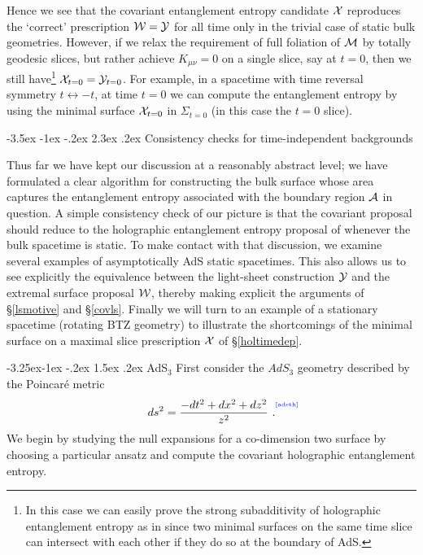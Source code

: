 \documentclass[12pt]{article}
\makeatletter
\renewcommand\section{\@startsection {section}{1}{\z@}%
                                   {-3.5ex \@plus -1ex \@minus -.2ex}%
                                   {2.3ex \@plus.2ex}%
                                   {\normalfont\large\bfseries}}
\renewcommand\subsection{\@startsection{subsection}{2}{\z@}%
                                     {-3.25ex\@plus -1ex \@minus -.2ex}%
                                     {1.5ex \@plus .2ex}%
                                     {\normalfont\bfseries}}
\newcommand{\be}{\begin{equation}}
\newcommand{\ee}{\end{equation}}
\def\sec#1{\S \;\ref{#1}}
\def\CA{{\cal A}}
\def\CW{{\cal W}}
\def\CX{{\cal X}}
\def\CY{{\cal Y}}
\def\f#1#2{{\frac{#1}{#2}}}
\def\f#1#2{{\frac{#1}{#2}}}
\def\Label#1{\label{#1}%
{ \color{blue}{\smash{\hbox to0pt{\raise2ex\hbox{\tiny[#1]}\hss}}}}}
\def\bulk{{\cal M}}
\def\Gms{\CW}
\def\Lms{\CY}
\def\Xms{\CX}
\def\rA{\CA}
\def\f {\frac}
\makeatother
\begin{document}
Hence we see that the covariant entanglement entropy candidate $\Xms$ reproduces the `correct' prescription $\Gms = \Lms$ for all time only in the trivial case of static bulk geometries.
However, if we relax the requirement of full foliation of $\bulk$ by totally geodesic slices,
 but rather achieve $K_{\mu\nu}=0$ on a single slice, say at $t=0$, then we still have\footnote{
In this case we can easily prove the strong subadditivity of
holographic entanglement entropy \cite{Hirata:2006jx} as in
\cite{Matt} since two minimal surfaces on the same time slice can
intersect with each other if they do so at the boundary of
AdS.} $\Xms_{t=0}=\Lms_{t=0}$. For
example, in a spacetime with time reversal symmetry
$t\leftrightarrow -t$, at time $t=0$ we can compute the entanglement
entropy by using the minimal surface $\Xms_{t=0}$ in $\Sigma_{t=0}$
(in this case the $t=0$ slice).



\section{Consistency checks for time-independent backgrounds}
\label{examples}


Thus far we have kept our discussion at a reasonably abstract level;
we have formulated a clear algorithm for constructing the bulk
surface whose area captures the entanglement entropy associated with
the boundary region $\rA$ in question. A simple consistency check of
our picture is that the covariant proposal should reduce to the
holographic entanglement entropy proposal of \cite{Ryu:2006bv,
Ryu:2006ef} whenever the bulk spacetime is static. To make contact
with that discussion, we examine several examples of asymptotically
AdS static spacetimes. This also allows us to see explicitly the
equivalence between the light-sheet construction $\Lms$ and the
extremal surface proposal $\Gms$, thereby making explicit the
arguments of \sec{lsmotive} and \sec{covls}. Finally we will turn to
an example of a stationary spacetime (rotating BTZ geometry) to
illustrate the shortcomings of the minimal surface on a maximal
slice prescription  $\Xms$ of \sec{holtimedep}.

\subsection{AdS$_{3}$}
\label{3adsex}
First consider the $AdS_3$ geometry described by the Poincar\'e metric
%
\be
ds^2=\f{-dt^2+dx^2+dz^2}{z^2} \ . \Label{adsth} \ee
%
We begin by studying the null expansions  for a co-dimension two surface by choosing a particular ansatz and compute the covariant holographic entanglement entropy.
\end{document}
